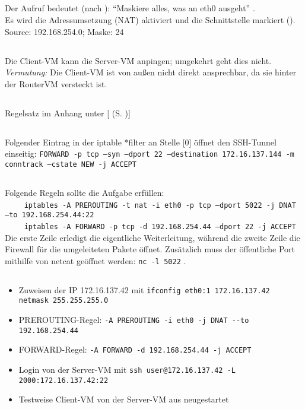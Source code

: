 \documentclass[twoside]{article}
\newcommand{\say}[1]{%
	``#1''%
}
\newcommand{\ttt}[1]{%
	\texttt{#1}%
}
\newcommand{\mref}[1]{[\nameref{#1} (S. \pageref{#1})]}
\begin{document}
	\subsection{}
	\label{ssec:3.1}
	Der Aufruf bedeutet (nach \cite{nat}): \say{Maskiere alles, was an eth0 ausgeht}.\\
	Es wird die Adressumsetzung (NAT) aktiviert und die Schnittstelle markiert (\cite{ubuntu:nat}).\\
	Source: 192.168.254.0; Maske: 24
	\subsection{}
	\label{ssec:3.2}
	Die Client-VM kann die Server-VM anpingen; umgekehrt geht dies nicht.\\
	\textit{Vermutung:} Die Client-VM ist von außen nicht direkt ansprechbar, da sie hinter der RouterVM versteckt ist.
	\subsection{}
	\label{ssec:3.3}
	Regelsatz im Anhang unter \mref{3.3-1}
	\subsection{}
	\label{ssec:3.4}
	Folgender Eintrag in der iptable *filter an Stelle [0] öffnet den SSH-Tunnel einseitig:
	\ttt{FORWARD -p tcp --syn --dport 22 --destination 172.16.137.144 -m conntrack --cstate NEW -j ACCEPT}
	\subsection{}
	\label{ssec:3.5}
	Folgende Regeln sollte die Aufgabe erfüllen:\\
	\-~~~~\ttt{iptables -A PREROUTING -t nat -i eth0 -p tcp --dport 5022 -j DNAT --to 192.168.254.44:22}\\
	\-~~~~\ttt{iptables -A FORWARD -p tcp -d 192.168.254.44 --dport 22 -j ACCEPT}\\
	Die erste Zeile erledigt die eigentliche Weiterleitung, während die zweite Zeile die Firewall für die umgeleiteten Pakete öffnet.
	Zusätzlich muss der öffentliche Port mithilfe von netcat geöffnet werden: \ttt{nc -l 5022}.
	\subsection{}
	\begin{itemize}
		\item Zuweisen der IP 172.16.137.42 mit \ttt{ifconfig eth0:1 172.16.137.42 netmask 255.255.255.0}
		\item PREROUTING-Regel: \ttt{-A PREROUTING -i eth0 -j DNAT {-}{-}to 192.168.254.44}
		\item FORWARD-Regel: \ttt{-A FORWARD -d 192.168.254.44 -j ACCEPT}
		\item Login von der Server-VM mit \ttt{ssh user@172.16.137.42 -L 2000:172.16.137.42:22}
		\item Testweise Client-VM von der Server-VM aus neugestartet
	\end{itemize}
	\label{ssec:3.6}
\end{document}
